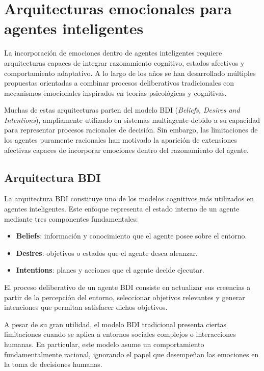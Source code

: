 \section{Arquitecturas emocionales para agentes inteligentes}

La incorporación de emociones dentro de agentes inteligentes requiere arquitecturas capaces de integrar razonamiento cognitivo, estados afectivos y comportamiento adaptativo. A lo largo de los años se han desarrollado múltiples propuestas orientadas a combinar procesos deliberativos tradicionales con mecanismos emocionales inspirados en teorías psicológicas y cognitivas.

Muchas de estas arquitecturas parten del modelo BDI (\textit{Beliefs, Desires and Intentions}), ampliamente utilizado en sistemas multiagente debido a su capacidad para representar procesos racionales de decisión. Sin embargo, las limitaciones de los agentes puramente racionales han motivado la aparición de extensiones afectivas capaces de incorporar emociones dentro del razonamiento del agente.

\subsection{Arquitectura BDI}

La arquitectura BDI constituye uno de los modelos cognitivos más utilizados en agentes inteligentes. Este enfoque representa el estado interno de un agente mediante tres componentes fundamentales:

\begin{itemize}
    \item \textbf{Beliefs}: información y conocimiento que el agente posee sobre el entorno.
    
    \item \textbf{Desires}: objetivos o estados que el agente desea alcanzar.
    
    \item \textbf{Intentions}: planes y acciones que el agente decide ejecutar.
\end{itemize}

El proceso deliberativo de un agente BDI consiste en actualizar sus creencias a partir de la percepción del entorno, seleccionar objetivos relevantes y generar intenciones que permitan satisfacer dichos objetivos.

A pesar de su gran utilidad, el modelo BDI tradicional presenta ciertas limitaciones cuando se aplica a entornos sociales complejos o interacciones humanas. En particular, este modelo asume un comportamiento fundamentalmente racional, ignorando el papel que desempeñan las emociones en la toma de decisiones humanas.

